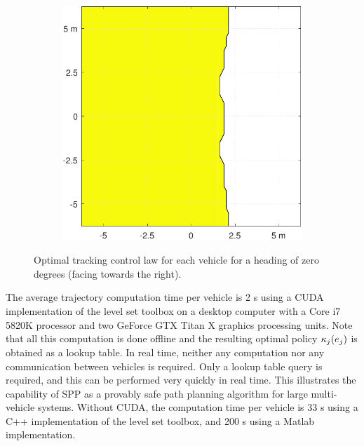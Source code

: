 \begin{figure}[!htb]
\begin{subfigure}{0.5\textwidth}
    \includegraphics[width=\columnwidth]{figs/Vcontrol}
    \label{fig:Vcontrol}
  \end{subfigure}%
  
  \caption{Optimal tracking control law for each vehicle for a heading of zero degrees (facing towards the right).}
  \label{fig:reactivity}
\end{figure}

The average trajectory computation time per vehicle is 2 s using a CUDA implementation of the level set toolbox on a desktop computer with a Core i7 5820K processor and two GeForce GTX Titan X graphics processing units. Note that all this computation is done offline and the resulting optimal policy $\kappa_j(e_j)$ is obtained as a lookup table. In real time, neither any computation nor any communication between vehicles is required. Only a lookup table query is required, and this can be performed very quickly in real time. This illustrates the capability of SPP as a provably safe path planning algorithm for large multi-vehicle systems. Without CUDA, the computation time per vehicle is 33 s using a C++ implementation of the level set toolbox, and 200 s using a Matlab implementation.